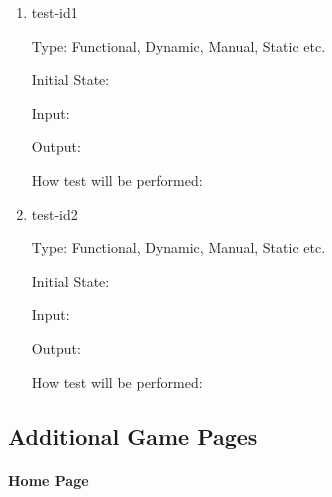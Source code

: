 \documentclass[12pt, titlepage]{article}
\begin{document}
\begin{enumerate}

\item{test-id1\\}

Type: Functional, Dynamic, Manual, Static etc.
					
Initial State: 
					
Input: 
					
Output: 
					
How test will be performed: 
					
\item{test-id2\\}

Type: Functional, Dynamic, Manual, Static etc.
					
Initial State: 
					
Input: 
					
Output: 
					
How test will be performed: 

\end{enumerate}

\subsection{Additional Game Pages}



\paragraph{Home Page}
\end{document}
